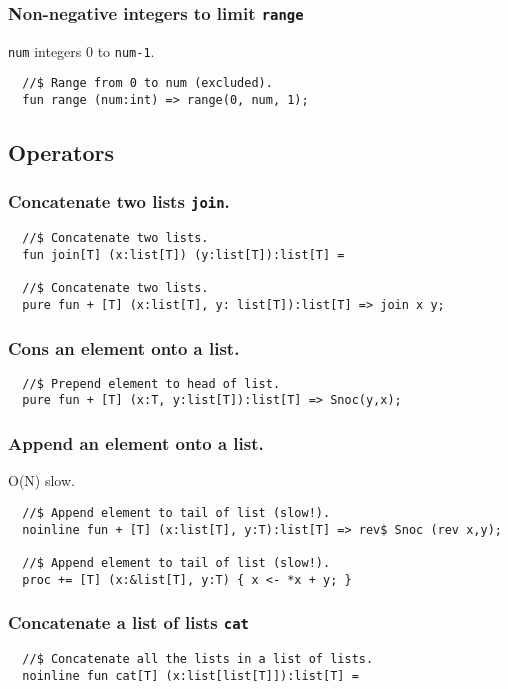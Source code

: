 \documentclass[oneside]{book}
\begin{document}
{\subsubsection{Non-negative integers to limit {\tt range}}
{\tt num} integers 0 to {\tt num-1}.

\begin{verbatim}
  //$ Range from 0 to num (excluded).
  fun range (num:int) => range(0, num, 1);
\end{verbatim}

\subsection{Operators}
\subsubsection{Concatenate two lists {\tt join}.}
\begin{verbatim}
  //$ Concatenate two lists.
  fun join[T] (x:list[T]) (y:list[T]):list[T] =
 
  //$ Concatenate two lists.
  pure fun + [T] (x:list[T], y: list[T]):list[T] => join x y;
\end{verbatim}

\subsubsection{Cons an element onto a list.}
\begin{verbatim}
  //$ Prepend element to head of list.
  pure fun + [T] (x:T, y:list[T]):list[T] => Snoc(y,x);
\end{verbatim}

\subsubsection{Append an element onto a list.}
O(N) slow.

\begin{verbatim}
  //$ Append element to tail of list (slow!).
  noinline fun + [T] (x:list[T], y:T):list[T] => rev$ Snoc (rev x,y);

  //$ Append element to tail of list (slow!).
  proc += [T] (x:&list[T], y:T) { x <- *x + y; }
\end{verbatim}

\subsubsection{Concatenate a list of lists {\tt cat}}
\begin{verbatim}
  //$ Concatenate all the lists in a list of lists.
  noinline fun cat[T] (x:list[list[T]]):list[T] =
\end{verbatim}

}
\end{document}
